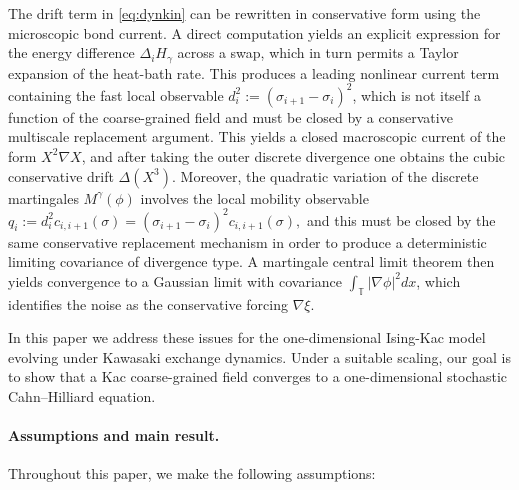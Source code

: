 \documentclass{article}
\begin{document}
The drift term in \eqref{eq:dynkin} can be rewritten in conservative form using the microscopic bond current.  
A direct computation yields an explicit expression for the energy difference
$\Delta_i H_\gamma$ across a swap, which in turn permits a Taylor expansion of the heat-bath rate.
This produces a leading nonlinear current term containing the fast local observable
$d^2_i := (\sigma_{i+1} - \sigma_i)^2$, which is not itself a function of the coarse-grained field and must be closed by a conservative multiscale replacement argument.
This yields a closed macroscopic current of the form $X^2\nabla X$, and after taking the outer discrete divergence one obtains the cubic conservative drift $\Delta(X^3)$.
Moreover, the quadratic variation of the discrete martingales $M^\gamma(\phi)$ involves the local mobility observable
\(
q_i:= d^2_i c_{i,i+1}(\sigma) =(\sigma_{i+1} - \sigma_i)^2c_{i,i+1}(\sigma),
\)
and this must be closed by the same conservative replacement mechanism in order to produce a deterministic limiting covariance of divergence type.
A martingale central limit theorem then yields convergence to a Gaussian limit with covariance
$\int_{\mathbb T} |\nabla \phi|^2 dx$, which identifies the noise as the conservative forcing $\nabla\xi$.

In this paper we address these issues for the one-dimensional Ising-Kac model evolving under Kawasaki exchange dynamics.  
Under a suitable scaling, our goal is to show that a Kac coarse-grained field converges to a one-dimensional stochastic Cahn–Hilliard equation.

\paragraph{Assumptions and main result.}

Throughout this paper, we make the following assumptions:
\end{document}
